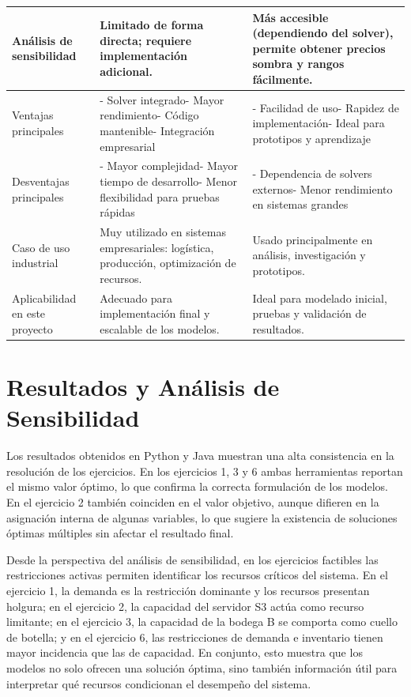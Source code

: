 \documentclass[12pt,a4paper]{article}
\begin{document}
\begin{longtable}{|>{\raggedright\arraybackslash}p{}|>{\raggedright\arraybackslash}p{}|>{\raggedright\arraybackslash}p{}|}
		\hline
		Análisis de sensibilidad & Limitado de forma directa; requiere implementación adicional. & Más accesible (dependiendo del solver), permite obtener precios sombra y rangos fácilmente. \\
		\hline
		Ventajas principales & - Solver integrado- Mayor rendimiento- Código mantenible- Integración empresarial & - Facilidad de uso- Rapidez de implementación- Ideal para prototipos y aprendizaje \\
		\hline
		Desventajas principales & - Mayor complejidad- Mayor tiempo de desarrollo- Menor flexibilidad para pruebas rápidas & - Dependencia de solvers externos- Menor rendimiento en sistemas grandes \\
		\hline
		Caso de uso industrial & Muy utilizado en sistemas empresariales: logística, producción, optimización de recursos. & Usado principalmente en análisis, investigación y prototipos. \\
		\hline
		Aplicabilidad en este proyecto & Adecuado para implementación final y escalable de los modelos. & Ideal para modelado inicial, pruebas y validación de resultados. \\
		\hline
	\end{longtable}
\normalsize

\section{Resultados y Análisis de Sensibilidad}

Los resultados obtenidos en Python y Java muestran una alta consistencia en la resolución de los ejercicios. En los ejercicios 1, 3 y 6 ambas herramientas reportan el mismo valor óptimo, lo que confirma la correcta formulación de los modelos. En el ejercicio 2 también coinciden en el valor objetivo, aunque difieren en la asignación interna de algunas variables, lo que sugiere la existencia de soluciones óptimas múltiples sin afectar el resultado final.

Desde la perspectiva del análisis de sensibilidad, en los ejercicios factibles las restricciones activas permiten identificar los recursos críticos del sistema. En el ejercicio 1, la demanda es la restricción dominante y los recursos presentan holgura; en el ejercicio 2, la capacidad del servidor S3 actúa como recurso limitante; en el ejercicio 3, la capacidad de la bodega B se comporta como cuello de botella; y en el ejercicio 6, las restricciones de demanda e inventario tienen mayor incidencia que las de capacidad. En conjunto, esto muestra que los modelos no solo ofrecen una solución óptima, sino también información útil para interpretar qué recursos condicionan el desempeño del sistema.
\end{document}
